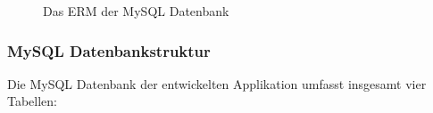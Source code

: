 \documentclass[../main.tex]{subfiles}
\begin{document}
	\begin{figure} 
		\centering
		\caption{Das ERM der MySQL Datenbank}
		\label{ERM}
	\end{figure}
	
	\subsubsection{MySQL Datenbankstruktur} \label{MySQLStructure}
	Die MySQL Datenbank der entwickelten Applikation umfasst insgesamt vier Tabellen:
	
\end{document}

